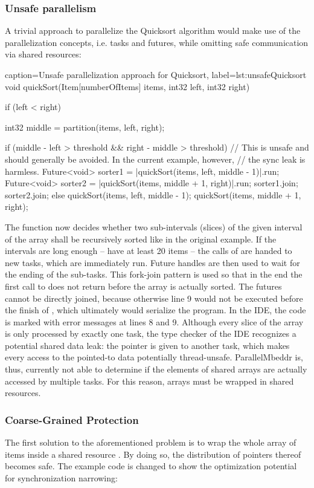 \subsubsection{Unsafe parallelism}
A trivial approach to parallelize the Quicksort algorithm would make use of the parallelization concepts, i.e. tasks and futures, while omitting safe communication via shared resources:
\begin{ccode}{caption=Unsafe parallelization approach for Quicksort, label=lst:unsafeQuicksort}
void quickSort(Item[numberOfItems] items, int32 left, int32 right) { 
  if (left < right) { 
    int32 middle = partition(items, left, right); 
     
    if (middle - left > threshold && right - middle > threshold) { 
      // This is unsafe and should generally be avoided. In the current example, however, 
      // the sync leak is harmless. 
      Future<void> sorter1 = |quickSort(items, left, middle - 1)|.run; 
      Future<void> sorter2 = |quickSort(items, middle + 1, right)|.run; 
      sorter1.join; 
      sorter2.join; 
    } else { 
      quickSort(items, left, middle - 1); 
      quickSort(items, middle + 1, right); 
    }
  } 
}
\end{ccode}
The function now decides whether two sub-intervals (slices) of the given interval of the array shall be recursively sorted like in the original example. If the intervals are long enough -- have at least 20 items -- the calls of  are handed to new tasks, which are immediately run. Future handles are then used to wait for the ending of the sub-tasks. This fork-join pattern is used so that in the end the first call to  does not return before the array is actually sorted. The futures cannot be directly joined, because otherwise line 9 would not be executed before the finish of , which ultimately would serialize the program. In the IDE, the code is marked with error messages at lines 8 and 9. Although every slice of the array is only processed by exactly one task, the type checker of the IDE recognizes a potential shared data leak: the pointer  is given to another task, which makes every access to the pointed-to data potentially thread-unsafe. ParallelMbeddr is, thus, currently not able to determine if the elements of shared arrays are actually accessed by multiple tasks. For this reason, arrays must be wrapped in shared resources.

\subsubsection{Coarse-Grained Protection}
The first solution to the aforementioned problem is to wrap the whole array of items inside a shared resource . By doing so, the distribution of pointers thereof becomes safe. The example code is changed to show the optimization potential for synchronization narrowing:

